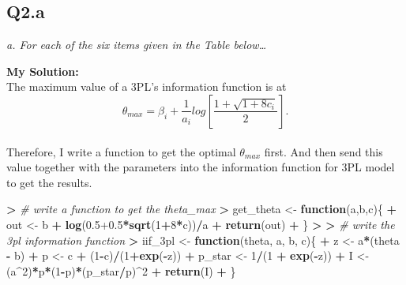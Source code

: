 \documentclass[
]{article}
\newenvironment{Shaded}{\begin{snugshade}}{\end{snugshade}}
\newcommand{\CommentTok}[1]{\textcolor[rgb]{0.56,0.35,0.01}{\textit{#1}}}
\newcommand{\ControlFlowTok}[1]{\textcolor[rgb]{0.13,0.29,0.53}{\textbf{#1}}}
\newcommand{\DecValTok}[1]{\textcolor[rgb]{0.00,0.00,0.81}{#1}}
\newcommand{\ErrorTok}[1]{\textcolor[rgb]{0.64,0.00,0.00}{\textbf{#1}}}
\newcommand{\FloatTok}[1]{\textcolor[rgb]{0.00,0.00,0.81}{#1}}
\newcommand{\FunctionTok}[1]{\textcolor[rgb]{0.13,0.29,0.53}{\textbf{#1}}}
\newcommand{\NormalTok}[1]{#1}
\newcommand{\OtherTok}[1]{\textcolor[rgb]{0.56,0.35,0.01}{#1}}
\newcommand{\SpecialCharTok}[1]{\textcolor[rgb]{0.81,0.36,0.00}{\textbf{#1}}}
\begin{document}
\hypertarget{q2.a}{%
\subsection{Q2.a}\label{q2.a}}

\emph{a. For each of the six items given in the Table below\ldots{}}

\textbf{My Solution:}\\
The maximum value of a 3PL's information function is at
\[\theta_{max}=\beta_i + \frac{1}{a_i}log[\frac{1+\sqrt{1+8c_i}}{2}].\]\\
Therefore, I write a function to get the optimal \(\theta_{max}\) first.
And then send this value together with the parameters into the
information function for 3PL model to get the results.

\begin{Shaded}
\begin{Highlighting}[]
\SpecialCharTok{\textgreater{}} \CommentTok{\# write a function to get the theta\_max}
\ErrorTok{\textgreater{}}\NormalTok{ get\_theta }\OtherTok{\textless{}{-}} \ControlFlowTok{function}\NormalTok{(a,b,c)\{}
\SpecialCharTok{+}\NormalTok{   out }\OtherTok{\textless{}{-}}\NormalTok{ b }\SpecialCharTok{+} \FunctionTok{log}\NormalTok{(}\FloatTok{0.5+0.5}\SpecialCharTok{*}\FunctionTok{sqrt}\NormalTok{(}\DecValTok{1}\SpecialCharTok{+}\DecValTok{8}\SpecialCharTok{*}\NormalTok{c))}\SpecialCharTok{/}\NormalTok{a}
\SpecialCharTok{+}   \FunctionTok{return}\NormalTok{(out)}
\SpecialCharTok{+}\NormalTok{ \}}
\SpecialCharTok{\textgreater{}} 
\ErrorTok{\textgreater{}} \CommentTok{\# write the 3pl information function}
\ErrorTok{\textgreater{}}\NormalTok{ iif\_3pl }\OtherTok{\textless{}{-}} \ControlFlowTok{function}\NormalTok{(theta, a, b, c)\{}
\SpecialCharTok{+}\NormalTok{   z }\OtherTok{\textless{}{-}}\NormalTok{ a}\SpecialCharTok{*}\NormalTok{(theta }\SpecialCharTok{{-}}\NormalTok{ b)}
\SpecialCharTok{+}\NormalTok{   p }\OtherTok{\textless{}{-}}\NormalTok{ c }\SpecialCharTok{+}\NormalTok{ (}\DecValTok{1}\SpecialCharTok{{-}}\NormalTok{c)}\SpecialCharTok{/}\NormalTok{(}\DecValTok{1}\SpecialCharTok{+}\FunctionTok{exp}\NormalTok{(}\SpecialCharTok{{-}}\NormalTok{z))}
\SpecialCharTok{+}\NormalTok{   p\_star }\OtherTok{\textless{}{-}} \DecValTok{1}\SpecialCharTok{/}\NormalTok{(}\DecValTok{1} \SpecialCharTok{+} \FunctionTok{exp}\NormalTok{(}\SpecialCharTok{{-}}\NormalTok{z))}
\SpecialCharTok{+}\NormalTok{   I }\OtherTok{\textless{}{-}}\NormalTok{ (a}\SpecialCharTok{\^{}}\DecValTok{2}\NormalTok{)}\SpecialCharTok{*}\NormalTok{p}\SpecialCharTok{*}\NormalTok{(}\DecValTok{1}\SpecialCharTok{{-}}\NormalTok{p)}\SpecialCharTok{*}\NormalTok{(p\_star}\SpecialCharTok{/}\NormalTok{p)}\SpecialCharTok{\^{}}\DecValTok{2}
\SpecialCharTok{+}   \FunctionTok{return}\NormalTok{(I)}
\SpecialCharTok{+}\NormalTok{ \}}
\end{Highlighting}
\end{Shaded}
\end{document}
